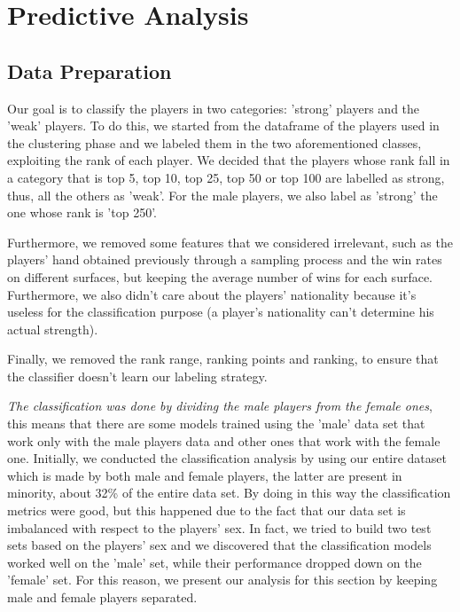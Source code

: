 \section{Predictive Analysis}
\subsection{Data Preparation}
Our goal is to classify the players in two categories: 'strong' players and the 'weak' players.
To do this, we started from the dataframe of the players used in the clustering phase and we labeled them in the two aforementioned classes, exploiting the rank of each player. We decided that the players whose rank fall in a category that is top 5, top 10, top 25, top 50 or top 100 are labelled as strong, thus, all the others as 'weak'. For the male players, we also label as 'strong' the one whose rank is 'top 250'.

Furthermore, we removed some features that we considered irrelevant, such as the players' hand obtained previously through a sampling process and the win rates on different surfaces, but keeping the average number of wins for each surface. Furthermore, we also didn't care about the players' nationality because it's useless for the classification purpose (a player's nationality can't determine his actual strength).

Finally, we removed the rank range, ranking points and ranking, to ensure that the classifier doesn't learn our labeling strategy.

\textit{The classification was done by dividing the male players from the female ones}, this means that there are some models trained using the 'male' data set that work only with the male players data and other ones that work with the female one.
Initially, we conducted the classification analysis by using our entire dataset which is made by both male and female players, the latter are present in minority, about 32\% of the entire data set. By doing in this way the classification metrics were good, but this happened due to the fact that our data set is imbalanced with respect to the players' sex. In fact, we tried to build two test sets based on the players' sex and we discovered that the classification models worked well on the 'male' set, while their performance dropped down on the 'female' set. For this reason, we present our analysis for this section by keeping male and female players separated.


